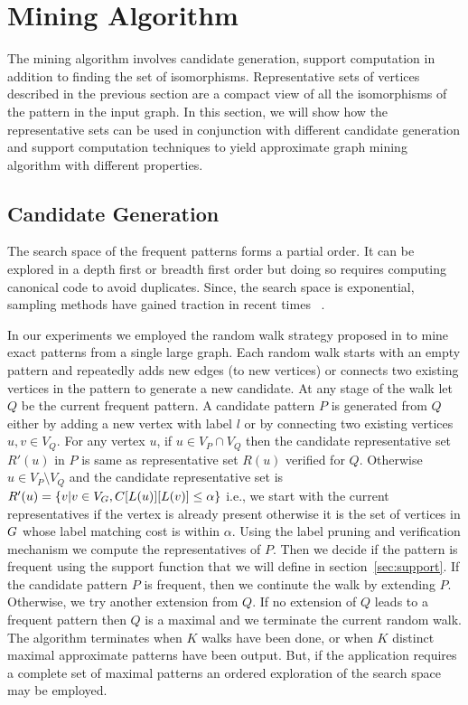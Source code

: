 \section{Mining Algorithm}
\label{sec:mining}
 The mining algorithm involves candidate generation, support computation in
 addition to finding the set of isomorphisms.  Representative sets of vertices
 described in the previous section are a compact view of all the isomorphisms of
 the pattern in the input graph. In this section, we will show how the
 representative sets can be used in conjunction with different candidate
 generation and support computation techniques to yield approximate graph mining
 algorithm with different properties.


\subsection{Candidate Generation} 

The search space of the frequent patterns forms a partial order.  It can be
explored in a depth first or breadth first order but doing so requires computing
canonical code to avoid duplicates. Since, the search space is exponential,
sampling methods have gained traction in recent
times~\cite{2008-origami:sadm,2009-graphsampling} . 


In our experiments we employed the random walk strategy proposed in
\cite{2012-kais} to mine exact patterns from a single large graph. Each random
walk starts with an empty pattern and repeatedly adds new edges (to new
vertices) or connects two existing vertices in the pattern to generate a new
candidate. At any stage of the walk let $Q$ be the current frequent pattern.  A
candidate pattern $P$ is generated from $Q$ either by adding a new vertex with
label $l$ or by connecting two existing vertices $u, v \in V_Q$.  For any vertex
$u$, if $u \in V_P \cap V_Q$ then the candidate representative set $R'(u)$ in
$P$ is same as representative set $R(u)$ verified for $Q$. Otherwise $u \in V_P
\setminus V_Q$ and the candidate representative set is $R'(u) = \{ v | v \in
V_G, {C}[L(u)][L(v)] \leq \alpha \} $ i.e., we start with the current
representatives if the vertex is already present otherwise it is the set of
vertices in $G$ whose label matching cost is within $\alpha$. Using the label
pruning and verification mechanism we compute the representatives of $P$.  Then
we decide if the pattern is frequent using the support function that we will
define in section~\ref{sec:support}. If the candidate pattern $P$ is frequent,
then we continute the walk by extending $P$. Otherwise, we  try another
extension from $Q$. If no extension of $Q$ leads to a frequent pattern then $Q$
is a maximal and we terminate the current random walk.  The algorithm terminates
when $K$ walks have been done, or when $K$ distinct maximal approximate patterns
have been output. But, if the application requires a complete set of maximal
patterns an ordered exploration of the search space may be employed.



